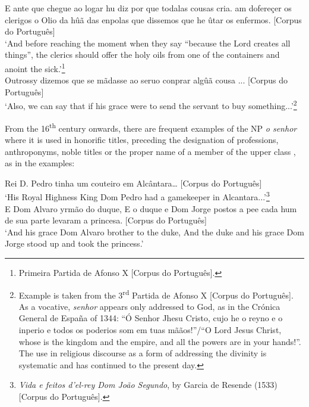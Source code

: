 \documentclass[output=paper]{langscibook}
\begin{document}
\ea\label{ex:marques:8}
{E ante que chegue ao logar hu diz por que  todalas cousas cria. am dofereçer os clerigos o Olio da hûã das enpolas que dissemos que he ûtar os enfermos.} [Corpus do Português]\\
\glt ‘And before reaching the moment when they say “because the Lord creates all things”, the clerics should offer the holy oils from one of the containers and anoint the sick.’\footnote{Primeira Partida de Afonso X [{Corpus do Português}].}\\
\ex\label{ex:marques:9}
{Outrossy dizemos que se  mãdasse ao seruo conprar algûã cousa} ... [Corpus do Português]\\
\glt ‘Also, we can say that if his grace were to send the servant to buy something...’\footnote{Example  is taken from the 3\textsuperscript{rd} Partida de Afonso X [Corpus do Português]. As a vocative, \textit{senhor} appears only addressed to God, as in the {Crónica General de España} of 1344: “{Ó Senhor} Jhesu Cristo, cujo he o reyno e o inperio e todos os poderios som em tuas mããos!”/“O Lord Jesus Christ, whose is the kingdom and the empire, and all the powers are in your hands!”. The use in religious discourse as a form of addressing the divinity is systematic and has continued to the present day.}\\
\z 

From the 16\textsuperscript{th} century onwards, there are frequent examples of the NP \textit{o senhor} where it is used in honorific titles, preceding the designation of professions, anthroponyms, noble titles  or the proper name of a member of the upper class , as in the examples:

\ea\label{ex:marques:10}
{ Rei D. Pedro tinha um couteiro em Alcântara}… [Corpus do Português]\\
\glt ‘His Royal Highness King Dom Pedro had a gamekeeper in Alcantara...’\footnote{\textit{Vida e feitos d’el-rey Dom João Segundo}, by Garcia de Resende (1533) [Corpus do Português].}\\
\ex\label{ex:marques:11}
{E {} Dom Alvaro yrmão do duque, E o duque e {} Dom Jorge postos a pee cada hum de sua parte levaram a princesa.} [Corpus do Português]\\
\glt ‘And his grace Dom Alvaro brother to the duke, And the duke and his grace Dom Jorge stood up and took the princess.’
\z 
\end{document}
